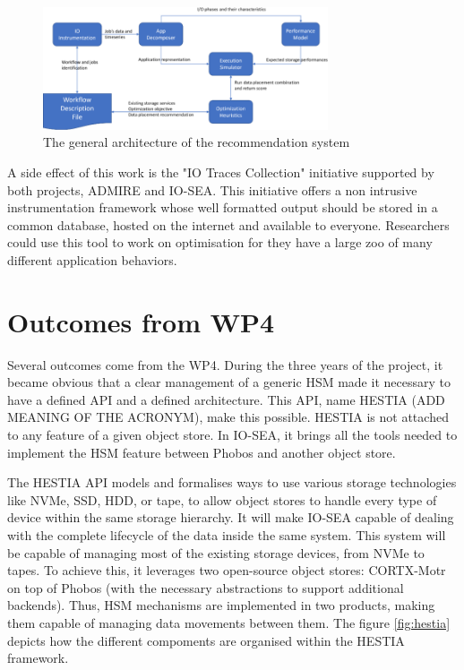 \begin{figure}[H]
    \centering
    \includegraphics[width=0.75\textwidth]{FIGS/recom.png}
    \caption[Recommendation system]{ The general architecture of the recommendation system}
    \label{fig:recom}
\end{figure}

A side effect of this work is the "IO Traces Collection" initiative supported by both projects, ADMIRE and
IO-SEA. This initiative offers a non intrusive instrumentation framework whose well formatted output should be
stored in a common database, hosted on the internet and available to everyone. Researchers could use this tool
to work on optimisation for they have a large zoo of many different application behaviors. 





\section{Outcomes from WP4}

Several outcomes come from the WP4. During the three years of the project, it became obvious that a clear 
management of a generic HSM made it necessary to have a defined API and a defined architecture. This API, name HESTIA (ADD MEANING OF THE ACRONYM), make this possible. HESTIA is not attached to any feature of a given object 
store. In IO-SEA, it brings all the tools needed to implement the HSM feature between Phobos and another object
store.

The HESTIA API models and formalises ways to use various storage technologies  like NVMe, SSD, HDD, or tape, to
allow object stores to handle every type of device within the same storage hierarchy. It will make IO-SEA 
capable of dealing with the complete lifecycle of the data inside the same system. This system will be capable of managing most of the existing storage devices, from NVMe to tapes. To achieve this, it leverages two open-source
object stores: CORTX-Motr on top of Phobos (with the necessary abstractions to support additional backends).
Thus, HSM mechanisms are implemented in two products, making them capable of managing data movements between
them. The figure \ref{fig:hestia} depicts how the different compoments are organised within the HESTIA 
framework. 

